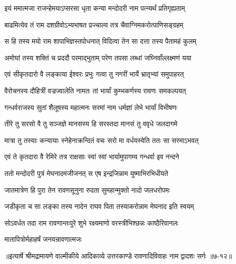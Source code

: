 \twolineshloka
{इयं ममात्मजा राजन्हेमयाऽप्सरसा धृता}
{कन्या मन्दोदरी नाम पत्न्यर्थं प्रतिगृह्यताम्} %

\twolineshloka
{बाढमित्येव तं राम दशग्रीवोऽभ्यभाषत}
{प्रज्चाल्य तत्र चैवाग्निमकरोत्पाणिसङ्ग्रहम्} %

\twolineshloka
{स हि तस्य मयो राम शापाभिज्ञस्तपोधनात्}
{विदित्वा तेन सा दत्ता तस्य पैतामहं कुलम्} %

\twolineshloka
{अमोघां तस्य शक्तिं च प्रददौ परमाद्भुताम्}
{परेण तपसा लब्धां जघ्निवाँल्लक्ष्मणं यया} %

\twolineshloka
{एवं सीकृतदारो वै लङ्काया ईश्वरः प्रभुः}
{गत्वा तु नगरीं भार्ये भ्रातृभ्यां समुपाहरत्} %

\twolineshloka
{वैरोचनस्य दौहित्रीं वज्रज्वालेति नामतः}
{तां भार्यां कुम्भकर्णस्य रावणः समकल्पयत्} %

\twolineshloka
{गन्धर्वराजस्य सुतां शैलूषस्य महात्मनः}
{सरमां नाम धर्मज्ञां लेभे भार्यां विभीषणः} %

\twolineshloka
{तीरे तु सरसो वै तु सञ्जज्ञे मानसस्य हि}
{सरस्तदा मानसं तु ववृधे जलदागमे} %

\twolineshloka
{मात्रा तु तस्याः कन्यायाः स्नेहेनाक्रन्दितं वचः}
{सरो मा वर्धयस्वेति ततः सा सरमाऽभवत्} %

\twolineshloka
{एवं ते कृतदारा वै रेमिरे तत्र राक्षसाः}
{स्वां स्वां भार्यामुपागम्य गन्धर्वा इव नन्दने} %

\twolineshloka
{ततो मन्दोदरी पुत्रं मेघनादमजीजनत्}
{स एष इन्द्रजिन्नाम युष्माभिरभिधीयते} %

\twolineshloka
{जातमात्रेण हि पुरा तेन रावणसूनुना}
{रुदता सुमहान्मुक्तो नादो जलधरोपमः} %

\twolineshloka
{जडीकृता च सा लङ्का तस्य नादेन राघव}
{पिता तस्याकरोन्नाम मेघनाद इति स्वयम्} %

\twolineshloka
{सोऽवर्धत तदा राम रावणान्तःपुरे शुभे}
{रक्ष्यमाणो वरस्त्रीभिश्छन्नः काष्ठैरिवानलः} %

\onelineshloka
{मातापित्रोर्महाहर्षं जनयन्रावणात्मजः} %


॥इत्यार्षे श्रीमद्रामायणे वाल्मीकीये आदिकाव्ये उत्तरकाण्डे रावणादिविवाहः नाम द्वादशः सर्गः ॥७-१२॥
